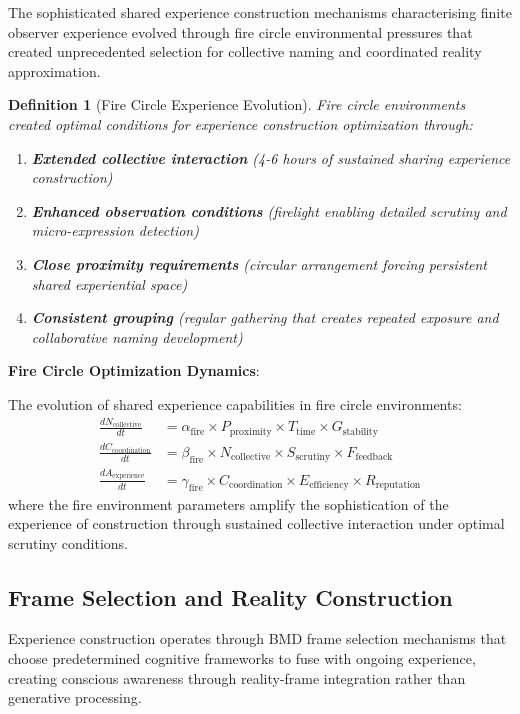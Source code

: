 \documentclass{article}
\newtheorem{definition}[theorem]{Definition}
\begin{document}
The sophisticated shared experience construction mechanisms characterising finite observer experience evolved through fire circle environmental pressures that created unprecedented selection for collective naming and coordinated reality approximation.

\begin{definition}[Fire Circle Experience Evolution]
Fire circle environments created optimal conditions for experience construction optimization through:
\begin{enumerate}
\item \textbf{Extended collective interaction} (4-6 hours of sustained sharing experience construction)
\item \textbf{Enhanced observation conditions} (firelight enabling detailed scrutiny and micro-expression detection)
\item \textbf{Close proximity requirements} (circular arrangement forcing persistent shared experiential space)
\item \textbf{Consistent grouping} (regular gathering that creates repeated exposure and collaborative naming development)
\end{enumerate}
\end{definition}

\textbf{Fire Circle Optimization Dynamics}:

The evolution of shared experience capabilities in fire circle environments:
\begin{align}
\frac{dN_{\text{collective}}}{dt} &= \alpha_{\text{fire}} \times P_{\text{proximity}} \times T_{\text{time}} \times G_{\text{stability}} \\
\frac{dC_{\text{coordination}}}{dt} &= \beta_{\text{fire}} \times N_{\text{collective}} \times S_{\text{scrutiny}} \times F_{\text{feedback}} \\
\frac{dA_{\text{experience}}}{dt} &= \gamma_{\text{fire}} \times C_{\text{coordination}} \times E_{\text{efficiency}} \times R_{\text{reputation}}
\end{align}
where the fire environment parameters amplify the sophistication of the experience of construction through sustained collective interaction under optimal scrutiny conditions.

\subsection{Frame Selection and Reality Construction}

Experience construction operates through BMD frame selection mechanisms that choose predetermined cognitive frameworks to fuse with ongoing experience, creating conscious awareness through reality-frame integration rather than generative processing.
\end{document}
